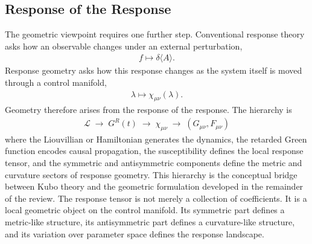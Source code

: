 \subsection{Response of the Response}
The geometric viewpoint requires one further step. Conventional
response theory asks how an observable changes under an
external perturbation,
\begin{align}
f
\longmapsto
\delta\langle A\rangle .
\end{align}
Response geometry asks how this response changes as the
system itself is moved through a control manifold,
\begin{align}
\lambda
\longmapsto
\chi_{\mu\nu}(\lambda).
\end{align}
Geometry therefore arises from the response of the response.
The hierarchy is
\begin{align}
\boxed{
\mathcal L
\;\longrightarrow\;
G^R(t)
\;\longrightarrow\;
\chi_{\mu\nu}
\;\longrightarrow\;
(G_{\mu\nu},F_{\mu\nu})
}
\end{align}
where the Liouvillian or Hamiltonian generates the dynamics,
the retarded Green function encodes causal propagation, the
susceptibility defines the local response tensor, and the
symmetric and antisymmetric components define the metric and
curvature sectors of response geometry.
This hierarchy is the conceptual bridge between Kubo theory and
the geometric formulation developed in the remainder of the
review. The response tensor is not merely a collection of
coefficients. It is a local geometric object on the control
manifold. Its symmetric part defines a metric-like structure, its
antisymmetric part defines a curvature-like structure, and its
variation over parameter space defines the response landscape.
